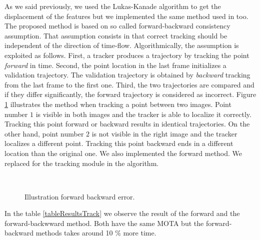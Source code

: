 As we said previously, we used the Lukas-Kanade algorithm to get the displacement of the features but we implemented the same method used in \cite{medianFlow} too. The proposed method is based on so called forward-backward consistency assumption. That assumption consists in that correct tracking should be independent of the direction of time-flow.
Algorithmically, the assumption is exploited as follows. First, a tracker produces a trajectory by tracking the point \textit{forward} in time. Second, the point location in the last frame initializes a validation trajectory. The validation trajectory is obtained by \textit{backward} tracking from the last frame to the first one. Third, the two trajectories are compared and if they differ significantly, the forward trajectory is considered as incorrect. 
Figure \ref{experiTrack5} illustrates the method when tracking a point between two images. Point number $1$  is visible in both images and the tracker is able to localize it correctly. Tracking this point forward or backward results in identical trajectories. On the other hand, point number $2$ is not visible in the right image and the tracker localizes a different point. Tracking this point backward ends in a different location than the original one. We also implemented the forward method. We replaced for the tracking module in the algorithm.


\begin{figure}[H]
		
\centering

\\
\caption{Illustration forward backward error.}
\label{experiTrack5}
\end{figure}


In the table \ref{tableResultsTrack} we observe the result of the forward and the forward-backwward method. Both have the same MOTA but the forward-backward methods takes around 10 $\%$ more time.

